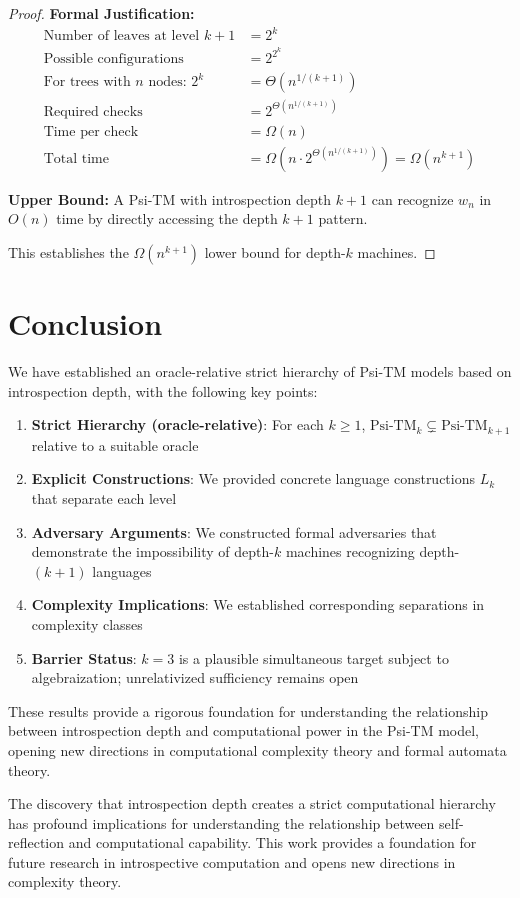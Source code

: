 \begin{proof}
\textbf{Formal Justification:}
\begin{align*}
\text{Number of leaves at level } k+1 &= 2^k \\
\text{Possible configurations} &= 2^{2^k} \\
\text{For trees with } n \text{ nodes: } 2^k &= \Theta(n^{1/(k+1)}) \\
\text{Required checks} &= 2^{\Theta(n^{1/(k+1)})} \\
\text{Time per check} &= \Omega(n) \\
\text{Total time} &= \Omega(n \cdot 2^{\Theta(n^{1/(k+1)})}) = \Omega(n^{k+1})
\end{align*}

\textbf{Upper Bound:}
A Psi-TM with introspection depth $k+1$ can recognize $w_n$ in $O(n)$ time by directly accessing the depth $k+1$ pattern.

This establishes the $\Omega(n^{k+1})$ lower bound for depth-$k$ machines.
\end{proof}

\section{Conclusion}

We have established an oracle-relative strict hierarchy of Psi-TM models based on introspection depth, with the following key points:

\begin{enumerate}
\item \textbf{Strict Hierarchy (oracle-relative)}: For each $k \geq 1$, $\text{Psi-TM}_k \subsetneq \text{Psi-TM}_{k+1}$ relative to a suitable oracle
\item \textbf{Explicit Constructions}: We provided concrete language constructions $L_k$ that separate each level
\item \textbf{Adversary Arguments}: We constructed formal adversaries that demonstrate the impossibility of depth-$k$ machines recognizing depth-$(k+1)$ languages
\item \textbf{Complexity Implications}: We established corresponding separations in complexity classes
\item \textbf{Barrier Status}: $k=3$ is a plausible simultaneous target subject to algebraization; unrelativized sufficiency remains open
\end{enumerate}

These results provide a rigorous foundation for understanding the relationship between introspection depth and computational power in the Psi-TM model, opening new directions in computational complexity theory and formal automata theory.

The discovery that introspection depth creates a strict computational hierarchy has profound implications for understanding the relationship between self-reflection and computational capability. This work provides a foundation for future research in introspective computation and opens new directions in complexity theory.

